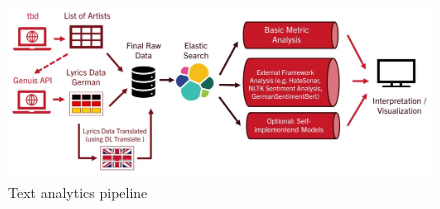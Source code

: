 \begin{figure}[!htb]
    \centering
    \includegraphics[width=\textwidth]{figures/pipeline.jpg}
    \caption[]{Text analytics pipeline}
    \label{fig:pipeline}
  \end{figure}
  